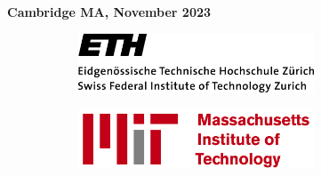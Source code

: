 \begin{titlepage}
\begin{center}
\vspace*{1.2cm}

\begin{Large}
\textbf{Cambridge MA, November 2023}
\end{Large}

\vspace*{1.2cm}

\begin{figure}[htb]
\newsavebox{\largestimage}
\captionsetup[subfigure]{labelformat=empty}
\vspace*{-0.0cm}
\centering
\setlength{\mylength}{\textwidth}
\begin{subfigure}[t]{0.5\mylength}
		\raggedright
		\includegraphics[width=7cm]{resources/logos/ethz logo.png}
\end{subfigure}%
\begin{subfigure}[t]{0.5\mylength}
		\raggedleft
		\includegraphics[width=7cm]{resources/logos/MIT_logo_2.png}
\end{subfigure}%
\vspace*{-2.3cm}
\end{figure}





\end{center}

\end{titlepage}